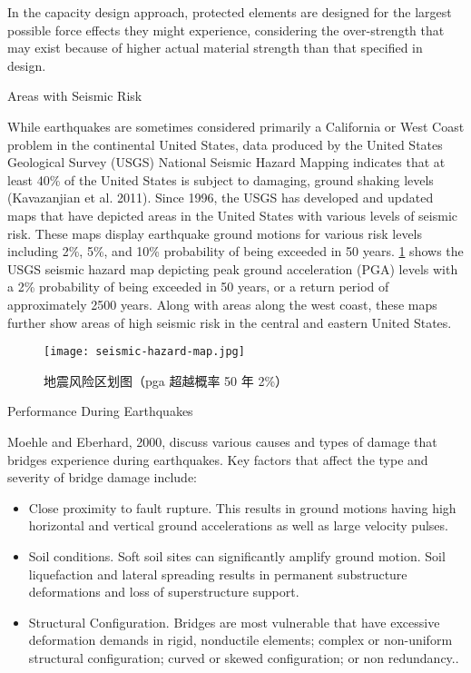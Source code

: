 In the capacity design approach, protected elements are designed for the largest possible force effects they might
experience, considering the over-strength that may exist because of higher actual material strength than that specified
in design.

Areas with Seismic Risk

While earthquakes are sometimes considered primarily a California or West Coast problem in the continental
United States, data produced by the United States Geological Survey (USGS) National Seismic Hazard Mapping
indicates that at least 40\% of the United States is subject to damaging, ground shaking levels (Kavazanjian et al.
2011). Since 1996, the USGS has developed and updated maps that have depicted areas in the United States with various levels of seismic risk. These maps display earthquake ground motions for various risk levels including 2\%,
5\%, and 10\% probability of being exceeded in 50 years. \cref{fig:seismic-hazard-map} shows the USGS seismic hazard map depicting
peak ground acceleration (PGA) levels with a 2\% probability of being exceeded in 50 years, or a return period of
approximately 2500 years. Along with areas along the west coast, these maps further show areas of high seismic risk
in the central and eastern United States.

\begin{figure}
  \texttt{[image: seismic-hazard-map.jpg]}
  \caption{地震风险区划图（\acrfull*{pga} 超越概率 50 年 2\%） }
  \label{fig:seismic-hazard-map}
\end{figure}

Performance During Earthquakes

Moehle and Eberhard, 2000, discuss various causes and types of damage that bridges experience during
earthquakes. Key factors that affect the type and severity of bridge damage include:

\begin{itemize}
  \item Close proximity to fault rupture. This results in ground motions having high horizontal and vertical ground accelerations as well as large velocity pulses.
  \item Soil conditions. Soft soil sites can significantly amplify ground motion. Soil liquefaction and lateral spreading results in permanent substructure deformations and loss of superstructure support.
  \item Structural Configuration. Bridges are most vulnerable that have excessive deformation demands in rigid,
  nonductile elements; complex or non-uniform structural configuration; curved or skewed configuration; or non redundancy..
\end{itemize}

